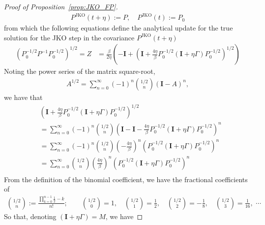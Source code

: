 \documentclass[reqno,11pt,letterpaper]{amsart}
\theoremstyle{plain}
\theoremstyle{definition}
\theoremstyle{remark}
\newcommand{\jko}{\mathrm{JKO}}
\newcommand{\id}{\mathbf{I}}
\begin{document}
\begin{proof}[Proof of Proposition~\ref{prop:JKO_FP}]
\begin{align*}
    P^{\jko}(t+\eta) := P, \quad P^{\jko}(t) := P_{0}
\end{align*}
from which the following equations define the analytical update for the true solution for the JKO step in the covariance $P^{\jko}(t+\eta)$
\begin{align*}
   \left(
   P_{0}^{-1/2} P^{-1} P_{0}^{-1/2}
   \right)^{1/2} = Z &= \frac{\beta}{2 \eta} \left( - \id + \left(
    \mathbf{I} + \frac{4 \eta}{\beta} P_{0}^{-1/2} (\id + \eta \Gamma ) P_{0}^{-1/2}
   \right)^{1/2}
   \right)
\end{align*}
Noting the power series of the matrix square-root,
\begin{align*}
    A^{1/2} = \sum_{n=0}^{\infty} (-1)^{n} {{1/2}\choose{n}} \left( \id - A \right)^{n}, 
\end{align*}
we have that
\begin{align*}
    & \left(
    \mathbf{I} + \frac{4 \eta}{\beta} P_{0}^{-1/2} (\id + \eta \Gamma ) P_{0}^{-1/2}
   \right)^{1/2} \\
   & = \sum_{n=0}^{\infty} (-1)^{n} {{1/2}\choose{n}} \left( \id -  \mathbf{I} - \frac{4 \eta}{\beta} P_{0}^{-1/2} (\id + \eta \Gamma ) P_{0}^{-1/2} \right)^{n} \\
   &= \sum_{n=0}^{\infty} (-1)^{n} {{1/2}\choose{n}} \left( -\frac{4 \eta}{\beta} \right)^{n} \left( P_{0}^{-1/2} (\id + \eta \Gamma ) P_{0}^{-1/2} \right)^{n} \\
   &= \sum_{n=0}^{\infty}  {{1/2}\choose{n}} \left(\frac{4 \eta}{\beta} \right)^{n} \left( P_{0}^{-1/2} (\id + \eta \Gamma ) P_{0}^{-1/2} \right)^{n} \\
\end{align*}
From the definition of the binomial coefficient, we have the fractional coefficients of
\begin{align}
    {{1/2}\choose{n}} := \frac{ \prod_{k=0}^{n-1} \frac12 - k}{n!}; \qquad  {{1/2}\choose{0}} = 1, \quad {{1/2}\choose{1}} = \frac{1}{2}, \quad {{1/2}\choose{2}} = - \frac{1}{8}, \quad {{1/2}\choose{3}} = \frac{1}{16}, \,\, \cdots
\end{align}
So that, denoting $(\id + \eta \Gamma ) = M$, we have


\end{proof}
\end{document}
